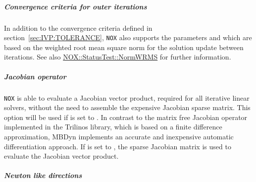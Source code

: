 \subparagraph{Convergence criteria for outer iterations}
In addition to the convergence criteria defined in section~\ref{sec:IVP:TOLERANCE}, \verb;NOX; also supports the parameters  and  which are based on the weighted root mean square norm for the solution update between iterations. See also \href{https://docs.trilinos.org/latest-release/packages/nox/doc/html/classNOX_1_1StatusTest_1_1NormWRMS.html}{NOX::StatusTest::NormWRMS} for further information.
\subparagraph{Jacobian operator}
\verb;NOX; is able to evaluate a Jacobian vector product, required for all iterative linear solvers, without the need to assemble the expensive Jacobian sparse matrix. This option will be used if  is set to . In contrast to the matrix free Jacobian operator implemented in the Trilinos library, which is based on a finite difference approximation, MBDyn implements an accurate and inexpensive automatic differentiation approach. If  is set to , the sparse Jacobian matrix is used to evaluate the Jacobian vector product.
\subparagraph{Newton like directions}

